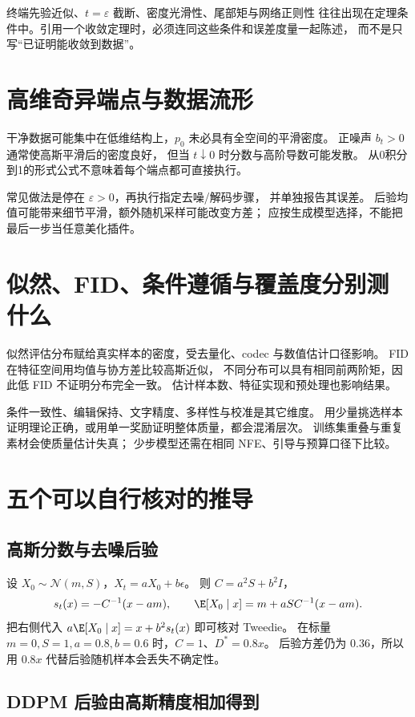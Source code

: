 终端先验近似、$t=\varepsilon$ 截断、密度光滑性、尾部矩与网络正则性
往往出现在定理条件中。引用一个收敛定理时，必须连同这些条件和误差度量一起陈述，
而不是只写“已证明能收敛到数据”。

\section{高维奇异端点与数据流形}

干净数据可能集中在低维结构上，$p_0$ 未必具有全空间的平滑密度。
正噪声 $b_t>0$ 通常使高斯平滑后的密度良好，
但当 $t\downarrow0$ 时分数与高阶导数可能发散。
从0积分到1的形式公式不意味着每个端点都可直接执行。

常见做法是停在 $\varepsilon>0$，再执行指定去噪/解码步骤，
并单独报告其误差。
后验均值可能带来细节平滑，额外随机采样可能改变方差；
应按生成模型选择，不能把最后一步当任意美化插件。

\section{似然、FID、条件遵循与覆盖度分别测什么}

似然评估分布赋给真实样本的密度，受去量化、codec 与数值估计口径影响。
FID 在特征空间用均值与协方差比较高斯近似，
不同分布可以具有相同前两阶矩，因此低 FID 不证明分布完全一致。
估计样本数、特征实现和预处理也影响结果。

条件一致性、编辑保持、文字精度、多样性与校准是其它维度。
用少量挑选样本证明理论正确，或用单一奖励证明整体质量，都会混淆层次。
训练集重叠与重复素材会使质量估计失真；
少步模型还需在相同 NFE、引导与预算口径下比较。

\section{五个可以自行核对的推导}

\subsection{高斯分数与去噪后验}

设 $X_0\sim\mathcal N(m,S)$，$X_t=aX_0+b\epsilon$。
则 $C=a^2S+b^2I$，
\[
s_t(x)=-C^{-1}(x-am),\qquad
\E[X_0\mid x]=m+aS C^{-1}(x-am).
\]
把右侧代入 $a\E[X_0\mid x]=x+b^2s_t(x)$ 即可核对 Tweedie。
在标量 $m=0,S=1,a=0.8,b=0.6$ 时，$C=1$、$D^*=0.8x$。
后验方差仍为 $0.36$，所以用 $0.8x$ 代替后验随机样本会丢失不确定性。

\subsection{DDPM 后验由高斯精度相加得到}

